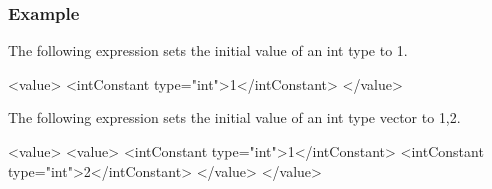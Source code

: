 \subsubsection*{Example}

The following expression sets the initial value of an int type to 1.
\vspace{2mm}

\begin{CExample}
<value>
  <intConstant type="int">1</intConstant>
</value>
\end{CExample}

The following expression sets the initial value of an int type vector to {1,2}.
\vspace{2mm}

\begin{XcodeMLExample}
<value>
  <value>
    <intConstant type="int">1</intConstant>
    <intConstant type="int">2</intConstant>
  </value>
</value>
\end{XcodeMLExample}


